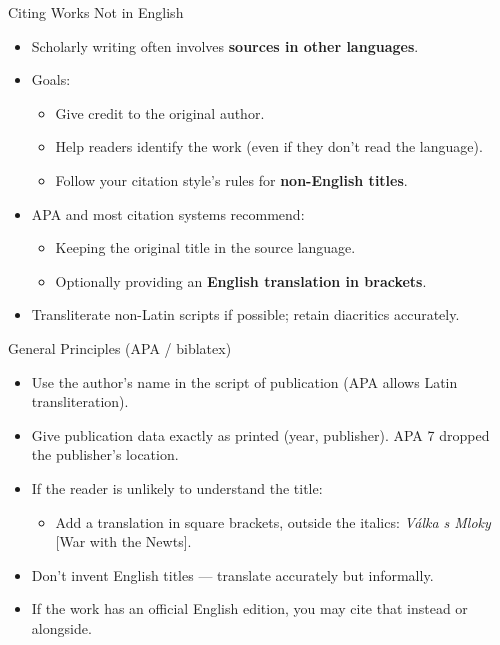 \documentclass[aspectratio=169]{beamer}
\begin{document}
\begin{frame}{Citing Works Not in English}
\begin{itemize}
  \item Scholarly writing often involves \textbf{sources in other languages}.
  \item Goals:
    \begin{itemize}
      \item Give credit to the original author.
      \item Help readers identify the work (even if they don’t read the language).
      \item Follow your citation style’s rules for \textbf{non-English titles}.
    \end{itemize}
  \item APA and most citation systems recommend:
    \begin{itemize}
      \item Keeping the original title in the source language.
      \item Optionally providing an \textbf{English translation in brackets}.
    \end{itemize}
  \item Transliterate non-Latin scripts if possible; retain diacritics accurately.
\end{itemize}
\end{frame}

\begin{frame}{General Principles (APA / biblatex)}
\begin{itemize}
  \item Use the author’s name in the script of publication (APA allows Latin transliteration).
  \item Give publication data exactly as printed (year, publisher).  APA 7
    dropped the publisher's location.
  \item If the reader is unlikely to understand the title:
    \begin{itemize}
      \item Add a translation in square brackets, outside the italics:
        \emph{Válka s Mloky} [War with the Newts].
    \end{itemize}
  \item Don’t invent English titles — translate accurately but informally.
  \item If the work has an official English edition, you may cite that instead or alongside.
\end{itemize}
\end{frame}
\end{document}
